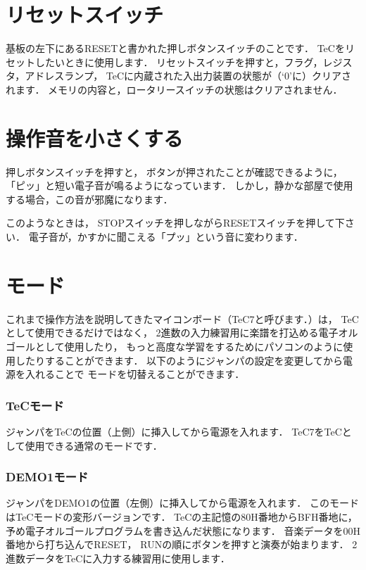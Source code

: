 \section{リセットスイッチ}
基板の左下にあるRESETと書かれた押しボタンスイッチのことです．
TeCをリセットしたいときに使用します．
リセットスイッチを押すと，フラグ，レジスタ，アドレスランプ，
TeCに内蔵された入出力装置の状態が（`0'に）クリアされます．
メモリの内容と，ロータリースイッチの状態はクリアされません．

\section{操作音を小さくする}
押しボタンスイッチを押すと，
ボタンが押されたことが確認できるように，
「ピッ」と短い電子音が鳴るようになっています．
しかし，静かな部屋で使用する場合，この音が邪魔になります．

このようなときは，
STOPスイッチを押しながらRESETスイッチを押して下さい．
電子音が，かすかに聞こえる「プッ」という音に変わります．

\section{モード}
これまで操作方法を説明してきたマイコンボード（TeC7と呼びます．）は，
TeCとして使用できるだけではなく，
2進数の入力練習用に楽譜を打込める電子オルゴールとして使用したり，
もっと高度な学習をするためにパソコンのように使用したりすることができます．
以下のようにジャンパの設定を変更してから電源を入れることで
モードを切替えることができます．


\subsubsection{TeCモード}
ジャンパをTeCの位置（上側）に挿入してから電源を入れます．
TeC7をTeCとして使用できる通常のモードです．

\subsubsection{DEMO1モード}
ジャンパをDEMO1の位置（左側）に挿入してから電源を入れます．
このモードはTeCモードの変形バージョンです．
TeCの主記憶の80H番地からBFH番地に，
予め電子オルゴールプログラムを書き込んだ状態になります．
音楽データを00H番地から打ち込んでRESET，
RUNの順にボタンを押すと演奏が始まります．
2進数データをTeCに入力する練習用に使用します．

